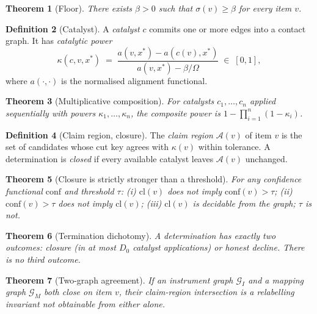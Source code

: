 \documentclass[11pt,a4paper]{article}
\newtheorem{theorem}{Theorem}[section]
\theoremstyle{definition}
\newtheorem{definition}[theorem]{Definition}
\theoremstyle{remark}
\newcommand{\Gph}{\mathcal{G}}
\newcommand{\flo}{\beta}
\newcommand{\sep}{\sigma}
\newcommand{\key}{\kappa}
\newcommand{\clos}{\mathrm{cl}}
\newcommand{\amb}{\mathcal{A}}
\newcommand{\pot}{\kappa}
\begin{document}
\begin{theorem}[Floor]
\label{thm:floor}
There exists $\flo>0$ such that $\sep(v)\ge\flo$ for every item $v$.
\end{theorem}

\begin{definition}[Catalyst]
\label{def:catalyst}
A \emph{catalyst} $c$ commits one or more edges into a contact graph.
It has \emph{catalytic power}
\[
  \pot(c,v,x^{\ast})
  \;=\;
  \frac{a(v,x^{\ast})-a(c(v),x^{\ast})}{a(v,x^{\ast})-\flo/\Omega}
  \;\in\;[0,1],
\]
where $a(\cdot,\cdot)$ is the normalised alignment functional.
\end{definition}

\begin{theorem}[Multiplicative composition]
\label{thm:mult}
For catalysts $c_1,\dots,c_n$ applied sequentially with powers
$\pot_1,\dots,\pot_n$, the composite power is
$1-\prod_{i=1}^{n}(1-\pot_i)$.
\end{theorem}

\begin{definition}[Claim region, closure]
\label{def:closure}
The \emph{claim region} $\amb(v)$ of item $v$ is the set of candidates
whose cut key agrees with $\key(v)$ within tolerance. A determination
is \emph{closed} if every available catalyst leaves $\amb(v)$ unchanged.
\end{definition}

\begin{theorem}[Closure is strictly stronger than a threshold]
\label{thm:closure-stronger}
For any confidence functional $\mathrm{conf}$ and threshold $\tau$:
(i) $\clos(v)$ does not imply $\mathrm{conf}(v)>\tau$;
(ii) $\mathrm{conf}(v)>\tau$ does not imply $\clos(v)$;
(iii) $\clos(v)$ is decidable from the graph; $\tau$ is not.
\end{theorem}

\begin{theorem}[Termination dichotomy]
\label{thm:dichotomy}
A determination has exactly two outcomes: closure (in at most $D_0$
catalyst applications) or honest decline. There is no third outcome.
\end{theorem}

\begin{theorem}[Two-graph agreement]
\label{thm:agreement}
If an instrument graph $\Gph_I$ and a mapping graph $\Gph_M$ both close
on item $v$, their claim-region intersection is a relabelling invariant
not obtainable from either alone.
\end{theorem}
\end{document}
